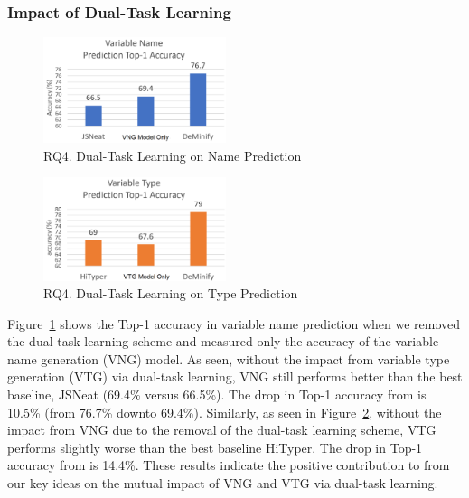 \subsubsection{Impact of Dual-Task Learning}
\label{sec:dual-task-result}


\begin{figure}[t]%
\begin{center}
\includegraphics[width=2.1in]{figures/dual-task-result-11}
\vspace{-8pt}
\caption{RQ4. Dual-Task Learning on Name Prediction}
\label{dual-task-result-1}
\end{center}
\end{figure}

\begin{figure}[t]%
\begin{center}
\includegraphics[width=2.1in]{figures/dual-task-result-22}
\vspace{-8pt}
\caption{RQ4. Dual-Task Learning on Type Prediction}
\label{dual-task-result-2}
\end{center}
\end{figure}

Figure~\ref{dual-task-result-1} shows the Top-1 accuracy in variable
name prediction when we removed the dual-task learning scheme and
measured only the accuracy of the variable name generation (VNG)
model.  As seen, without the impact from variable type generation
(VTG) via dual-task learning, VNG still performs better than the best
baseline, JSNeat (69.4\% versus 66.5\%). The drop in Top-1 accuracy
from {\tool} is 10.5\% (from 76.7\% downto 69.4\%). Similarly, as seen
in Figure~\ref{dual-task-result-2}, without the impact from VNG due to
the removal of the dual-task learning scheme, VTG performs slightly
worse than the best baseline HiTyper. The drop in Top-1 accuracy from
{\tool} is 14.4\%.  These results indicate the positive contribution to {\tool}
from our key ideas on the mutual impact of VNG and VTG via dual-task
learning.
